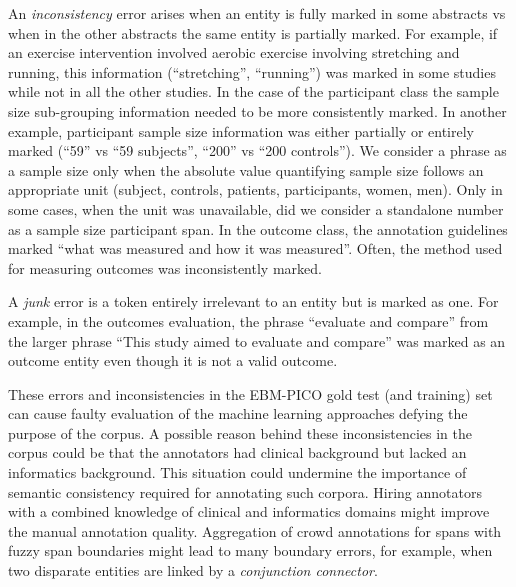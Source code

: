 \documentclass[10.7pt,]{article}
\begin{document}
An \textit{inconsistency} error arises when an entity is fully marked in some abstracts vs when in the other abstracts the same entity is partially marked. 
For example, if an exercise intervention involved aerobic exercise involving stretching and running, this information (``stretching'', ``running'') was marked in some studies while not in all the other studies.
In the case of the participant class the sample size sub-grouping information needed to be more consistently marked.
In another example, participant sample size information was either partially or entirely marked (``59'' vs ``59 subjects'', ``200'' vs ``200 controls'').
We consider a phrase as a sample size only when the absolute value quantifying sample size follows an appropriate unit (subject, controls, patients, participants, women, men). 
Only in some cases, when the unit was unavailable, did we consider a standalone number as a sample size participant span.
In the outcome class, the annotation guidelines marked ``what was measured and how it was measured''. 
Often, the method used for measuring outcomes was inconsistently marked.



A \textit{junk} error is a token entirely irrelevant to an entity but is marked as one.
For example, in the outcomes evaluation, the phrase ``evaluate and compare'' from the larger phrase ``This study aimed to evaluate and compare'' was marked as an outcome entity even though it is not a valid outcome.



These errors and inconsistencies in the EBM-PICO gold test (and training) set can cause faulty evaluation of the machine learning approaches defying the purpose of the corpus.
A possible reason behind these inconsistencies in the corpus could be that the annotators had clinical background but lacked an informatics background.
This situation could undermine the importance of semantic consistency required for annotating such corpora.
Hiring annotators with a combined knowledge of clinical and informatics domains might improve the manual annotation quality.
Aggregation of crowd annotations for spans with fuzzy span boundaries might lead to many boundary errors, for example, when two disparate entities are linked by a \textit{conjunction connector}.
%
%
%
%
%
\end{document}

